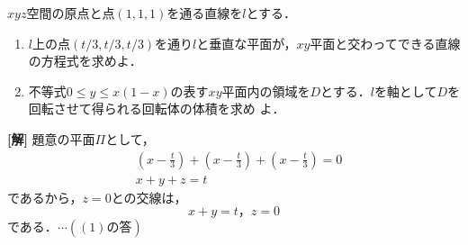 \documentclass[a4j]{jarticle}
\begin{document}

     \begin{oframed}
     $xyz$空間の原点と点$(1,1,1)$を通る直線を$l$とする．
          \begin{enumerate}[(1)]
          \item $l$上の点$(t/3,t/3,t/3)$を通り$l$と垂直な平面が，$xy$平面と交わってできる直線の方程式を求めよ．
          \item 不等式$0\le y\le x(1-x)$の表す$xy$平面内の領域を$D$とする．$l$を軸として$D$を回転させて得られる回転体の体積を求め
          よ．
          \end{enumerate}
     \end{oframed}

\setlength{\columnseprule}{0.4pt}
\begin{multicols}{2}
{\bf[解]} 題意の平面$\Pi$として，
     \begin{align*}
     &\left(x-\frac{t}{3}\right)+\left(x-\frac{t}{3}\right)+\left(x-\frac{t}{3}\right)=0 \\
     &x+y+z=t
     \end{align*}
であるから，$z=0$との交線は，
     \[x+y=t，z=0\]
である．$\cdots((1)の答)$     


\end{multicols}
\end{document}
